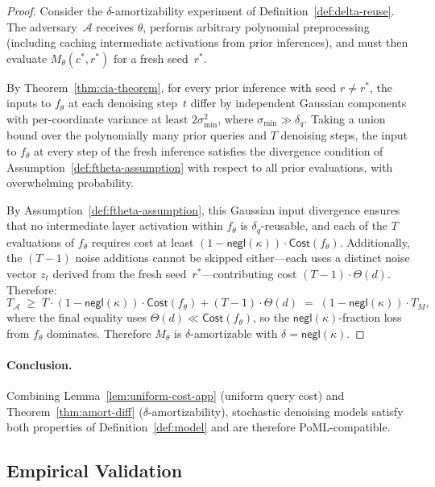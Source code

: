 \begin{proof}
Consider the $\delta$-amortizability experiment of Definition~\ref{def:delta-reuse}. The adversary~$\mathcal{A}$ receives $\theta$, performs arbitrary polynomial preprocessing (including caching intermediate activations from prior inferences), and must then evaluate $M_\theta(c^*, r^*)$ for a fresh seed~$r^*$.

By Theorem~\ref{thm:cia-theorem}, for every prior inference with seed $r \neq r^*$, the inputs to $f_\theta$ at each denoising step~$t$ differ by independent Gaussian components with per-coordinate variance at least $2\sigma_{\min}^2$, where $\sigma_{\min} \gg \delta_q$. Taking a union bound over the polynomially many prior queries and $T$ denoising steps, the input to $f_\theta$ at every step of the fresh inference satisfies the divergence condition of Assumption~\ref{def:ftheta-assumption} with respect to all prior evaluations, with overwhelming probability.

By Assumption~\ref{def:ftheta-assumption}, this Gaussian input divergence ensures that no intermediate layer activation within $f_\theta$ is $\delta_q$-reusable, and each of the $T$ evaluations of $f_\theta$ requires cost at least $(1 - \mathsf{negl}(\kappa)) \cdot \mathsf{Cost}(f_\theta)$. Additionally, the $(T-1)$ noise additions cannot be skipped either---each uses a distinct noise vector $z_t$ derived from the fresh seed~$r^*$---contributing cost $(T-1) \cdot \Theta(d)$. Therefore:
\[
    T_{\mathcal{A}} \;\geq\; T \cdot (1 - \mathsf{negl}(\kappa)) \cdot \mathsf{Cost}(f_\theta) + (T-1)\cdot\Theta(d) \;=\; (1 - \mathsf{negl}(\kappa)) \cdot T_M,
\]
where the final equality uses $\Theta(d) \ll \mathsf{Cost}(f_\theta)$, so the $\mathsf{negl}(\kappa)$-fraction loss from $f_\theta$ dominates.
Therefore $M_\theta$ is $\delta$-amortizable with $\delta = \mathsf{negl}(\kappa)$.
\end{proof}

\paragraph{Conclusion.}
Combining Lemma~\ref{lem:uniform-cost-app} (uniform query cost) and Theorem~\ref{thm:amort-diff} ($\delta$-amortizability), stochastic denoising models satisfy both properties of Definition~\ref{def:model} and are therefore PoML-compatible.

\subsection{Empirical Validation}
\label{app:cia-experiments}

